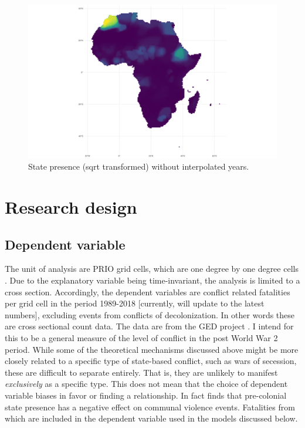 \documentclass[12pt]{article}
\begin{document}
\begin{figure}[htpb]
	\centering
	\includegraphics[width=\linewidth]{../R/Output/sp_os_sum.pdf}
	\caption{State presence (sqrt transformed) without interpolated years.}
	\label{Sp}
\end{figure}


\section{Research design}

\subsection{Dependent variable}

The unit of analysis are PRIO grid cells, which are one degree by one degree
cells \citep{Tollefsen2012}. Due to the explanatory variable being
time-invariant, the analysis is limited to a cross section. Accordingly, the
dependent variables are conflict related fatalities per grid cell in the period
1989-2018 [currently, will update to the latest numbers], excluding events from
conflicts of decolonization. In other words these are cross sectional count
data. The data are from the GED project \citep{Sundberg2013}. I intend for this
to be a general measure of the level of conflict in the post World War 2 period.
While some of the theoretical mechanisms discussed above might be more closely
related to a specific type of state-based conflict, such as wars of secession,
these are difficult to separate entirely. That is, they are unlikely to manifest
\textit{exclusively} as a specific type. This does not mean that the choice of
dependent variable biases in favor or finding a relationship. In fact
\citet{Wishman2021a} finds that pre-colonial state presence has a negative
effect on communal violence events. Fatalities from which are included in the
dependent variable used in the models discussed below.
\end{document}
